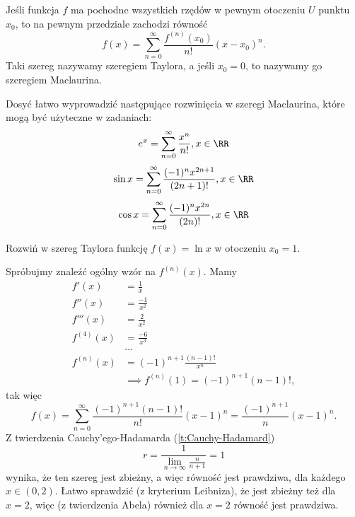 \begin{theorem}
    Jeśli funkcja $f$ ma pochodne wszystkich rzędów w pewnym otoczeniu $U$ punktu $x_0$, to na pewnym przedziale zachodzi równość
    \[ f(x) = \sum_{n=0}^\infty \frac{f^{(n)}(x_0)}{n!}(x - x_0)^n. \]
    Taki szereg nazywamy szeregiem Taylora, a jeśli $x_0 = 0$, to nazywamy go szeregiem Maclaurina.
\end{theorem}

\begin{fact}
    Dosyć łatwo wyprowadzić następujące rozwinięcia w szeregi Maclaurina, które mogą być użyteczne w zadaniach:
    \[ e^x = \sum_{n=0}^\infty \frac{x^n}{n!}, x \in \RR \]
    \[ \sin{x} = \sum_{n=0}^\infty \frac{(-1)^n x^{2n+1}}{(2n+1)!}, x \in \RR \]
    \[ \cos{x} = \sum_{n=0}^\infty \frac{(-1)^n x^{2n}}{(2n)!}, x \in \RR \]
\end{fact}

\begin{example}
    Rozwiń w szereg Taylora funkcję $f(x) = \ln{x}$ w otoczeniu $x_0 = 1$.
\end{example}
\begin{solution}
    Spróbujmy znaleźć ogólny wzór na $f^{(n)}(x)$. Mamy
    \begin{align*}
        f'(x) &= \frac{1}{x} \\
        f''(x) &= \frac{-1}{x^2} \\
        f'''(x) &= \frac{2}{x^2} \\
        f^{(4)}(x) &= \frac{-6}{x^3} \\
        &\ldots \\
        f^{(n)}(x) &= (-1)^{n+1}\frac{(n-1)!}{x^n} \\
        &\implies f^{(n)}(1) = (-1)^{n+1}(n-1)!,
    \end{align*}
    tak więc
    \[ f(x) = \sum_{n=0}^\infty \frac{(-1)^{n+1}(n-1)!}{n!}(x-1)^n = \frac{(-1)^{n+1}}{n}(x-1)^n. \]
    Z twierdzenia Cauchy'ego-Hadamarda (\ref{t:Cauchy-Hadamard})
    \[ r = \frac{1}{\lim\limits_{n\to\infty}\frac{n}{n+1}} = 1 \]
    wynika, że ten szereg jest zbieżny, a więc równość jest prawdziwa, dla każdego $x \in (0, 2)$. Łatwo sprawdzić (z kryterium Leibniza), że jest zbieżny też dla $x = 2$, więc (z twierdzenia Abela) również dla $x = 2$ równość jest prawdziwa.
\end{solution}

